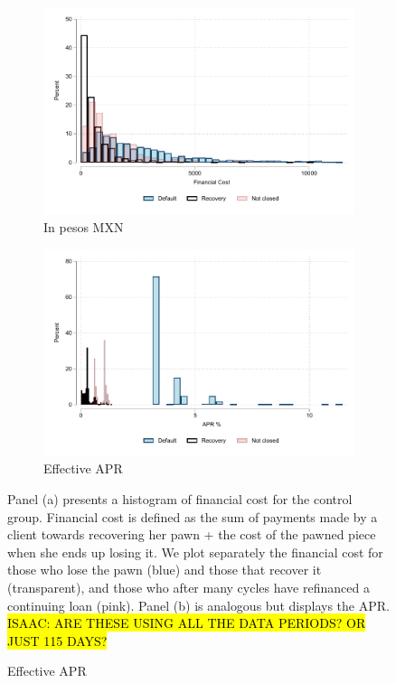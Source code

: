 \documentclass[oneside,11pt]{article}
\begin{document}
{\vspace{.2in}
\begin{figure}[H]
     \caption{Financial cost}
    \label{fc_hist}
    \begin{center}
    \begin{subfigure}{.45\textwidth}
      \caption{In pesos MXN}
        \centering
        \includegraphics[width=\textwidth]{Figuras/hist_fc.pdf}
    \end{subfigure}
     \begin{subfigure}{0.45\textwidth}
    \caption{Effective APR}
       \centering
      \includegraphics[width=\textwidth]{Figuras/hist_apr.pdf}
    \end{subfigure}
    \end{center}
         \scriptsize
         Panel (a) presents a histogram of financial cost for the control group. Financial cost is defined as the sum of payments made by a client towards recovering her pawn + the cost of the pawned piece when she ends up losing it. We plot separately the financial cost for those who lose the pawn (blue) and those that recover it (transparent), and those who after many cycles have refinanced a continuing loan (pink).  Panel (b) is analogous but displays the APR.  %
         \hl{ISAAC: ARE THESE USING ALL THE DATA PERIODS? OR JUST 115 DAYS?}
\end{figure}


}
\end{document}
